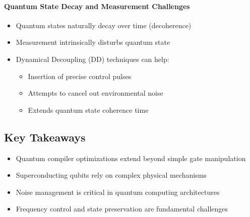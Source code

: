 \paragraph{Quantum State Decay and Measurement Challenges}
\begin{itemize}
  \item Quantum states naturally decay over time (decoherence)

  \item Measurement intrinsically disturbs quantum state

  \item Dynamical Decoupling (DD) techniques can help:
    \begin{itemize}
      \item Insertion of precise control pulses
      \item Attempts to cancel out environmental noise
      \item Extends quantum state coherence time
    \end{itemize}
\end{itemize}

\subsection*{Key Takeaways}

\begin{itemize}
  \item Quantum compiler optimizations extend beyond simple gate manipulation
  \item Superconducting qubits rely on complex physical mechanisms
  \item Noise management is critical in quantum computing architectures
  \item Frequency control and state preservation are fundamental challenges
\end{itemize}


